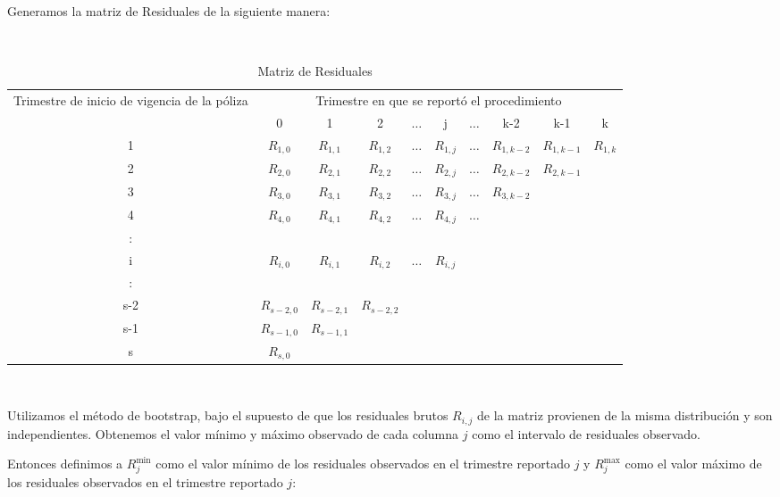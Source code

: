 \documentclass[11pt,twoside,openright,spanish]{report}
\numberwithin{equation}{chapter}
\numberwithin{figure}{chapter}
\numberwithin{table}{chapter}
\begin{document}
	Generamos la matriz de Residuales de la siguiente manera:
	
	$ $

	\begin{table}[ht]
		\centering
			\caption{Matriz de Residuales}
		\begin{tabularx}{\linewidth}{ c|ccccccccc}
			\multirow{2}{4cm}{Trimestre de inicio de vigencia de la póliza}
			& \multicolumn{9}{c}{Trimestre en que se reportó el procedimiento} \\
			& 0  & 1 & 2 & $ \dots $ & j & $\dots $ & k-2 & k-1 &  k \\
			\midrule
			1      &  $R_{1,0}^{ }$ & $R_{1,1}^{ }$ & $R_{1,2}^{ }$ & $ \dots $ & $R_{1,j}^{ }$ & $ \dots $ & $R_{1,k-2}^{ }$ & $R_{1,k-1}^{ }$ & $R_{1,k}^{ }$ \\
			2      &  $R_{2,0}^{ }$ & $R_{2,1}^{ }$ & $R_{2,2}^{ }$ & $ \dots $ & $R_{2,j}^{ }$ & $ \dots $ & $R_{2,k-2}^{ }$ & $R_{2,k-1}^{ }$ & \\
			3      &  $R_{3,0}^{ }$ & $R_{3,1}^{ }$ & $R_{3,2}^{ }$ & $ \dots $ & $R_{3,j}^{ }$ & $ \dots $ & $R_{3,k-2}^{ }$ & & \\
			4      &  $R_{4,0}^{ }$ & $R_{4,1}^{ }$ & $R_{4,2}^{ }$ & $ \dots $ & $R_{4,j}^{ }$ & $ \dots $ & & & \\
			:      & & & & & & & & & \\
			i      &  $R_{i,0}^{ }$ & $R_{i,1}^{ }$ & $R_{i,2}^{ }$ & $ \dots $ & $R_{i,j}^{ }$ & & & & \\
			:      & & & & & & & & & \\
			s-2      &  $R_{s-2,0}^{ }$ & $R_{s-2,1}^{ }$ & $R_{s-2,2}^{ }$ & & & & & & \\
			s-1      &  $R_{s-1,0}^{ }$ & $R_{s-1,1}^{ }$ & & & & & & & \\
			s      &  $R_{s,0}^{ }$ & & & & & & & & \\
		\end{tabularx}
	\end{table}
 
 $ $
 
	Utilizamos el método de bootstrap, bajo el supuesto de que los residuales brutos $R_{i,j}$ de la matriz provienen de la misma distribución y son independientes. Obtenemos el valor mínimo y máximo observado de cada columna $j$ como el intervalo de residuales observado.
	 
	Entonces definimos a $R_{j}^{\text{min}}$ como el valor mínimo de los residuales observados en el trimestre reportado $j$ y $R_{j}^{\text{max}}$ como el valor máximo de los residuales observados en el trimestre reportado $j$:
	
\end{document}
